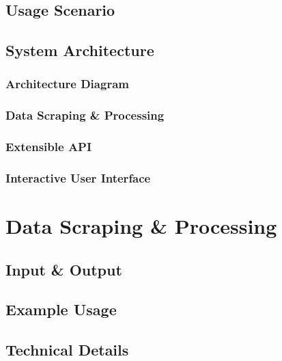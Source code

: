 \documentclass{article}
\begin{document}
\subsection{Usage Scenario}

\subsection{System Architecture}

\subsubsection{Architecture Diagram}

\subsubsection{Data Scraping \& Processing}

\subsubsection{Extensible API}

\subsubsection{Interactive User Interface}


\newpage
\section{Data Scraping \& Processing}

\subsection{Input \& Output}

\subsection{Example Usage}

\subsection{Technical Details}
\end{document}
